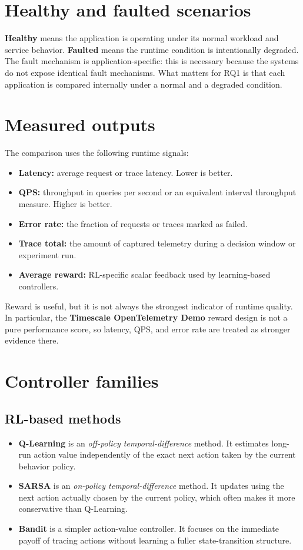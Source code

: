 \documentclass[11pt]{report}
\newcommand{\QL}{\textbf{Q-Learning}}
\newcommand{\SARSA}{\textbf{SARSA}}
\newcommand{\Bandit}{\textbf{Bandit}}
\newcommand{\TS}{\textbf{Timescale OpenTelemetry Demo}}
\begin{document}
\section{Healthy and faulted scenarios}
\textbf{Healthy} means the application is operating under its normal workload and service behavior. \textbf{Faulted} means the runtime condition is intentionally degraded. The fault mechanism is application-specific: this is necessary because the systems do not expose identical fault mechanisms. What matters for RQ1 is that each application is compared internally under a normal and a degraded condition.

\section{Measured outputs}
The comparison uses the following runtime signals:
\begin{itemize}
    \item \textbf{Latency:} average request or trace latency. Lower is better.
    \item \textbf{QPS:} throughput in queries per second or an equivalent interval throughput measure. Higher is better.
    \item \textbf{Error rate:} the fraction of requests or traces marked as failed.
    \item \textbf{Trace total:} the amount of captured telemetry during a decision window or experiment run.
    \item \textbf{Average reward:} RL-specific scalar feedback used by learning-based controllers.
\end{itemize}
Reward is useful, but it is not always the strongest indicator of runtime quality. In particular, the \TS{} reward design is not a pure performance score, so latency, QPS, and error rate are treated as stronger evidence there.

\section{Controller families}
\subsection{RL-based methods}
\begin{itemize}
    \item \QL{} is an \emph{off-policy temporal-difference} method. It estimates long-run action value independently of the exact next action taken by the current behavior policy.
    \item \SARSA{} is an \emph{on-policy temporal-difference} method. It updates using the next action actually chosen by the current policy, which often makes it more conservative than Q-Learning.
    \item \Bandit{} is a simpler action-value controller. It focuses on the immediate payoff of tracing actions without learning a fuller state-transition structure.
\end{itemize}
\end{document}
